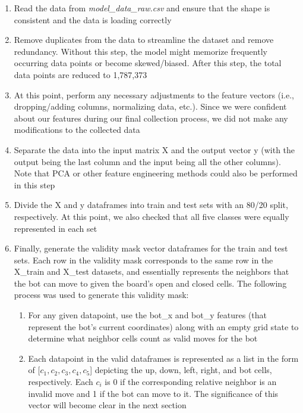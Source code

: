 \documentclass[11pt]{article}
\begin{document}
\begin{enumerate}
    \begin{enumerate}
        \item Read the data from \emph{model\_data\_raw.csv} and ensure that the shape is consistent and the data is loading correctly
        \item Remove duplicates from the data to streamline the dataset and remove redundancy. Without this step, the model might memorize frequently occurring data points or become skewed/biased. After this step, the total data points are reduced to 1,787,373
        \item At this point, perform any necessary adjustments to the feature vectors (i.e., dropping/adding columns, normalizing data, etc.). Since we were confident about our features during our final collection process, we did not make any modifications to the collected data
        \item Separate the data into the input matrix X and the output vector y (with the output being the last column and the input being all the other columns). Note that PCA or other feature engineering methods could also be performed in this step
        \item Divide the X and y dataframes into train and test sets with an 80/20 split, respectively. At this point, we also checked that all five classes were equally represented in each set
        \item Finally, generate the validity mask vector dataframes for the train and test sets. Each row in the validity mask corresponds to the same row in the X\_train and X\_test datasets, and essentially represents the neighbors that the bot can move to given the board's open and closed cells. The following process was used to generate this validity mask:
        \begin{enumerate}
            \item For any given datapoint, use the bot\_x and bot\_y features (that represent the bot's current coordinates) along with an empty grid state to determine what neighbor cells count as valid moves for the bot
            \item Each datapoint in the valid dataframes is represented as a list in the form of [$c_1, c_2, c_3, c_4, c_5$] depicting the up, down, left, right, and bot cells, respectively. Each $c_i$ is 0 if the corresponding relative neighbor is an invalid move and 1 if the bot can move to it. The significance of this vector will become clear in the next section
        \end{enumerate}
    \end{enumerate}

\end{enumerate}
\end{document}

